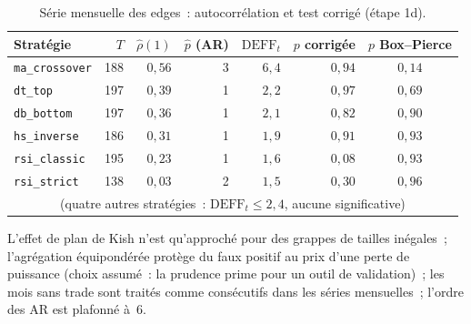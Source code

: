 \begin{table}[H]
\centering
\caption{Série mensuelle des edges~: autocorrélation et test corrigé (étape 1d).}
\label{tab:b1-dep-mensuel}
\small
\begin{tabular}{@{}lrrrrrc@{}}
\toprule
Stratégie & $T$ & $\hat\rho(1)$ & $\hat p$ (AR) & $\mathrm{DEFF}_t$ & $p$ corrigée & $p$ Box--Pierce \\
\midrule
\texttt{ma\_crossover} & 188 & $0{,}56$ & 3 & $6{,}4$ & $0{,}94$ & $0{,}14$ \\
\texttt{dt\_top}       & 197 & $0{,}39$ & 1 & $2{,}2$ & $0{,}97$ & $0{,}69$ \\
\texttt{db\_bottom}    & 197 & $0{,}36$ & 1 & $2{,}1$ & $0{,}82$ & $0{,}90$ \\
\texttt{hs\_inverse}   & 186 & $0{,}31$ & 1 & $1{,}9$ & $0{,}91$ & $0{,}93$ \\
\texttt{rsi\_classic}  & 195 & $0{,}23$ & 1 & $1{,}6$ & $0{,}08$ & $0{,}93$ \\
\texttt{rsi\_strict}   & 138 & $0{,}03$ & 2 & $1{,}5$ & $0{,}30$ & $0{,}96$ \\
\multicolumn{7}{c}{\footnotesize (quatre autres stratégies~: $\mathrm{DEFF}_t \le 2{,}4$, aucune significative)} \\
\bottomrule
\end{tabular}
\end{table}

\begin{limites}
L'effet de plan de Kish n'est qu'approché pour des grappes de tailles
inégales~; l'agrégation équipondérée protège du faux positif au prix
d'une perte de puissance (choix assumé~: la prudence prime pour un outil
de validation)~; les mois sans trade sont traités comme consécutifs dans
les séries mensuelles~; l'ordre des AR est plafonné à~6.
\end{limites}

